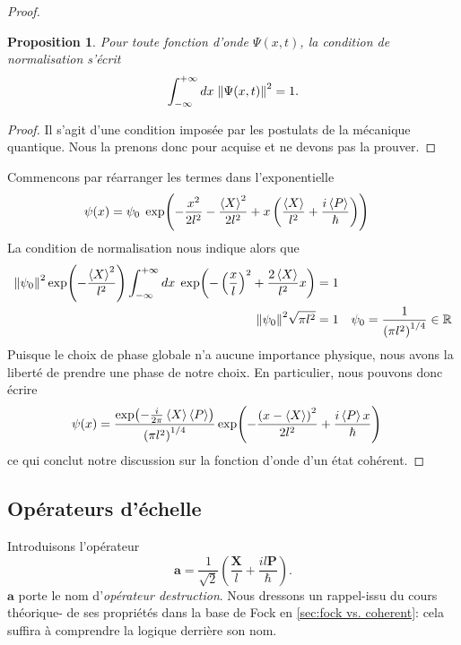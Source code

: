 \documentclass[11pt,oneside,a4paper]{article}
\newcommand{\h}{\ensuremath{\hbar}}
\newtheorem{property}[theorem]{Proposition}
\begin{document}
\begin{proof}
\begin{property}
  \label{prop:condition de normalisation anal}
    Pour toute fonction d'onde $\Psi(x,t)$, la condition de normalisation s'écrit 
    \begin{equation}
        \int_{-\infty}^{+\infty}dx \; \norm{\Psi(x,t)}^2= 1.
    \end{equation}
\end{property}
\begin{proof}
  Il s'agit d'une condition imposée par les postulats de la mécanique quantique. Nous la prenons donc pour acquise et ne devons pas la prouver.
\end{proof}
Commencons par réarranger les termes dans l'exponentielle
\begin{align}
  \psi(x) &= \psi_0 \; \exp(-\frac{x^2}{2l^2}-\frac{\expval{X}^2}{2l^2}+x\left(\frac{\expval{X}}{l^2}+\frac{i\expval{P}}{\h}\right))\notag
\end{align}
La condition de normalisation nous indique alors que
\begin{align}
  \norm{\psi_0}^2 \exp(-\frac{\expval{X}^2}{l^2})\int_{-\infty}^{+\infty} dx \; \exp(-\left(\frac{x}{l}\right)^2+\frac{2\expval{X}}{l^2}x) &= 1\notag\\
  \norm{\psi_0}^2 \sqrt{\pi l^2} &= 1 &\psi_0 = \frac{1}{\left(\pi l^2\right)^{1/4}}\in\mathbb{R}\notag
\end{align} 
Puisque le choix de phase globale n'a aucune importance physique, nous avons la liberté de prendre une phase de notre choix. En particulier, nous pouvons donc écrire 
\begin{align}
  \psi(x) &= \frac{\exp(-\frac{i}{2\pi}\expval{X}\expval{P})}{\left(\pi l^2\right)^{1/4}}\exp(-\frac{\left(x-\expval{X}\right)^2}{2l^2}+\frac{i\expval{P}x}{\hbar})\notag
\end{align}
ce qui conclut notre discussion sur la fonction d'onde d'un état cohérent. \end{proof}
\subsection{Opérateurs d'échelle} \label{opérateur d'échelle}
Introduisons l'opérateur
\begin{equation}
  \bm{a} = \frac{1}{\sqrt{2}}\left(\frac{\bm{X}}{l}+\frac{il\bm{P}}{\h}\right).
\end{equation}
$\bm{a}$ porte le nom d'\emph{opérateur destruction}. Nous dressons un rappel-issu du cours théorique- de ses propriétés dans la base de Fock en \ref{sec:fock vs. coherent}: cela suffira à comprendre la logique derrière son nom.
\end{document}
